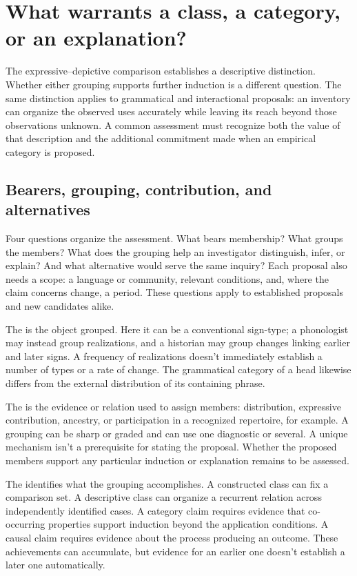 \section{What warrants a class, a category, or an explanation?}\label{sec:assessment}

The expressive--depictive comparison establishes a descriptive distinction.
Whether either grouping supports further induction is a different question.
The same distinction applies to grammatical and interactional proposals:
an inventory can organize the observed uses accurately while leaving
its reach beyond those observations unknown. A common assessment must
recognize both the value of that description and the additional commitment
made when an empirical category is proposed.

\subsection{Bearers, grouping, contribution, and alternatives}

Four questions organize the assessment. What bears membership? What groups
the members? What does the grouping help an investigator distinguish,
infer, or explain? And what alternative would serve the same inquiry?
Each proposal also needs a scope: a language or community, relevant
conditions, and, where the claim concerns change, a period. These
questions apply to established proposals and new candidates alike.

The  is the object grouped. Here it can be a conventional
sign-type; a phonologist may instead group realizations, and a historian
may group changes linking earlier and later signs. A frequency of
realizations doesn't immediately establish a number of types or a rate
of change. The grammatical category of a head likewise differs from
the external distribution of its containing phrase.

The  is the evidence or relation used to assign
members: distribution, expressive contribution, ancestry, or participation
in a recognized repertoire, for example. A grouping can be sharp or
graded and can use one diagnostic or several. A unique mechanism isn't
a prerequisite for stating the proposal. Whether the proposed members
support any particular induction or explanation remains to be assessed.

The  identifies what the grouping accomplishes. A
constructed class can fix a comparison set. A descriptive class can
organize a recurrent relation across independently identified cases.
A category claim requires evidence that co-occurring properties support
induction beyond the application conditions. A causal claim requires
evidence about the process producing an outcome. These achievements
can accumulate, but evidence for an earlier one doesn't establish a
later one automatically.

